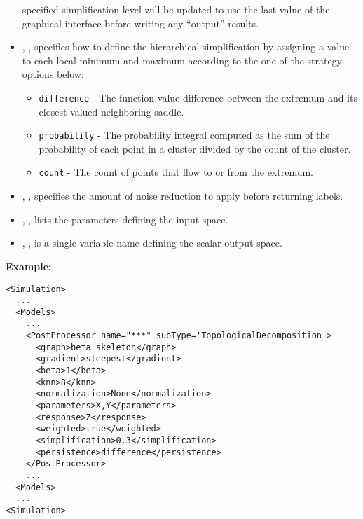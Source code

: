 \begin{itemize}
  specified simplification level will be updated to use the last value of the
  graphical interface before writing any ``output'' results.
  \item {}, , specifies how
  to define the hierarchical simplification by assigning a value to each local
  minimum and maximum according to the one of the strategy options below:
  \begin{itemize}
    \item \texttt{difference} - The function value difference between the
    extremum and its closest-valued neighboring saddle.
    \item \texttt{probability} - The probability integral computed as the
    sum of the probability of each point in a cluster divided by the count of
    the cluster.
    \item \texttt{count} - The count of points that flow to or from the
    extremum.
  \end{itemize}
  \item {}, , specifies the
  amount of noise reduction to apply before returning labels.
  \item {}, ,
  lists the parameters defining the input space.
  \item {}, , is a single
  variable name defining the scalar output space.
\end{itemize}
\textbf{Example:}
\begin{lstlisting}[style=XML,morekeywords={subType}]
<Simulation>
  ...
  <Models>
    ...
    <PostProcessor name="***" subType='TopologicalDecomposition'>
      <graph>beta skeleton</graph>
      <gradient>steepest</gradient>
      <beta>1</beta>
      <knn>8</knn>
      <normalization>None</normalization>
      <parameters>X,Y</parameters>
      <response>Z</response>
      <weighted>true</weighted>
      <simplification>0.3</simplification>
      <persistence>difference</persistence>
    </PostProcessor>
    ...
  <Models>
  ...
<Simulation>
\end{lstlisting}



